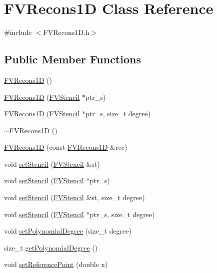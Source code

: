 \hypertarget{classFVRecons1D}{
\section{FVRecons1D Class Reference}
\label{d7/d44/classFVRecons1D}
}


{\ttfamily \#include $<$FVRecons1D.h$>$}

\subsection*{Public Member Functions}
\begin{DoxyCompactItemize}
\item 
\hyperlink{classFVRecons1D_a6146b6ee0af1a92509e45a9261786e93}{FVRecons1D} ()
\item 
\hyperlink{classFVRecons1D_a6a3f5e98edc9b452300f64e12dec81fb}{FVRecons1D} (\hyperlink{classFVStencil}{FVStencil} $\ast$ptr\_\-s)
\item 
\hyperlink{classFVRecons1D_a34b28ffea07632ac9f4927a15d98e8ee}{FVRecons1D} (\hyperlink{classFVStencil}{FVStencil} $\ast$ptr\_\-s, size\_\-t degree)
\item 
\hyperlink{classFVRecons1D_a0b1a51af09a9736dd87796cad9c4409c}{$\sim$FVRecons1D} ()
\item 
\hyperlink{classFVRecons1D_a1b5dd39ac32ef8c0bda1824fc0c087b4}{FVRecons1D} (const \hyperlink{classFVRecons1D}{FVRecons1D} \&rec)
\item 
void \hyperlink{classFVRecons1D_a34d8474a5f5470cab6f077871c7387da}{setStencil} (\hyperlink{classFVStencil}{FVStencil} \&st)
\item 
void \hyperlink{classFVRecons1D_a9fd35e2a4d7096ce3fec84bfc30bf095}{setStencil} (\hyperlink{classFVStencil}{FVStencil} $\ast$ptr\_\-s)
\item 
void \hyperlink{classFVRecons1D_a82cbc1bab2638e760ea3ca50bd393ba6}{setStencil} (\hyperlink{classFVStencil}{FVStencil} \&st, size\_\-t degree)
\item 
void \hyperlink{classFVRecons1D_a6d820346769771af609dbdaa7b1f3021}{setStencil} (\hyperlink{classFVStencil}{FVStencil} $\ast$ptr\_\-s, size\_\-t degree)
\item 
void \hyperlink{classFVRecons1D_a277a64063b5e54974f88aa36f01dd729}{setPolynomialDegree} (size\_\-t degree)
\item 
size\_\-t \hyperlink{classFVRecons1D_a51ced9e32566282ad2c8aa54e23f3cc5}{getPolynomialDegree} ()
\item 
void \hyperlink{classFVRecons1D_ade06e8c8d61be70bf976ab2ee71fe9da}{setReferencePoint} (double x)

\end{DoxyCompactItemize}
